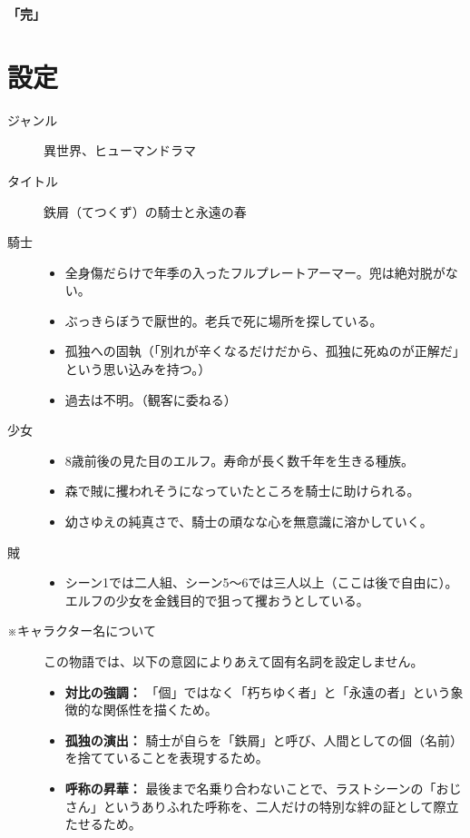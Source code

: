 \textbf{「完」}

\clearpage\section{設定}
\begin{description}
    \item [ジャンル] 異世界、ヒューマンドラマ
    \item [タイトル] 鉄屑（てつくず）の騎士と永遠の春
        \item [騎士]
            \begin{itemize}
            \item 全身傷だらけで年季の入ったフルプレートアーマー。兜は絶対脱がない。
            \item ぶっきらぼうで厭世的。老兵で死に場所を探している。
            \item 孤独への固執（「別れが辛くなるだけだから、孤独に死ぬのが正解だ」という思い込みを持つ。）
            \item 過去は不明。（観客に委ねる）
            \end{itemize}
        \item [少女]
            \begin{itemize}
            \item 8歳前後の見た目のエルフ。寿命が長く数千年を生きる種族。
            \item 森で賊に攫われそうになっていたところを騎士に助けられる。
            \item 幼さゆえの純真さで、騎士の頑なな心を無意識に溶かしていく。
            \end{itemize}
        \item [賊~~~]
            \begin{itemize}
            \item シーン1では二人組、シーン5〜6では三人以上（ここは後で自由に）。エルフの少女を金銭目的で狙って攫おうとしている。
            \end{itemize}
        
        \item [※キャラクター名について]
        この物語では、以下の意図によりあえて固有名詞を設定しません。
        \begin{itemize}
            \item \textbf{対比の強調：} 「個」ではなく「朽ちゆく者」と「永遠の者」という象徴的な関係性を描くため。
            \item \textbf{孤独の演出：} 騎士が自らを「鉄屑」と呼び、人間としての個（名前）を捨てていることを表現するため。
            \item \textbf{呼称の昇華：} 最後まで名乗り合わないことで、ラストシーンの「おじさん」というありふれた呼称を、二人だけの特別な絆の証として際立たせるため。
        \end{itemize}
\end{description}

